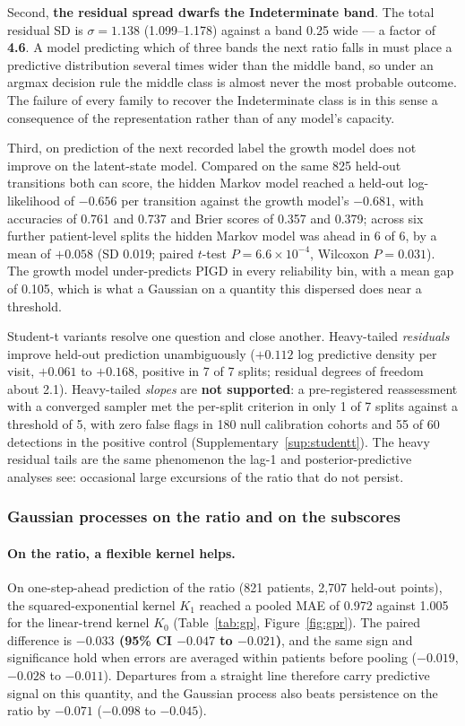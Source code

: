 \documentclass[11pt]{article}
\begin{document}
Second, \textbf{the residual spread dwarfs the Indeterminate band}. The total
residual SD is $\sigma = 1.138$ (1.099--1.178) against a band 0.25 wide --- a
factor of \textbf{4.6}. A model predicting which of three bands the next ratio
falls in must place a predictive distribution several times wider than the middle
band, so under an argmax decision rule the middle class is almost never the most
probable outcome. The failure of every family to recover the Indeterminate class
is in this sense a consequence of the representation rather than of any model's
capacity.

Third, on prediction of the next recorded label the growth model does not improve
on the latent-state model. Compared on the same 825 held-out transitions both can
score, the hidden Markov model reached a held-out log-likelihood of $-0.656$ per
transition against the growth model's $-0.681$, with accuracies of 0.761 and
0.737 and Brier scores of 0.357 and 0.379; across six further patient-level
splits the hidden Markov model was ahead in 6 of 6, by a mean of $+0.058$ (SD
0.019; paired $t$-test $P = 6.6\times10^{-4}$, Wilcoxon $P = 0.031$). The growth
model under-predicts PIGD in every reliability bin, with a mean gap of 0.105,
which is what a Gaussian on a quantity this dispersed does near a threshold.

Student-t variants resolve one question and close another. Heavy-tailed
\emph{residuals} improve held-out prediction unambiguously ($+0.112$ log
predictive density per visit, $+0.061$ to $+0.168$, positive in 7 of 7 splits;
residual degrees of freedom about 2.1). Heavy-tailed \emph{slopes} are
\textbf{not supported}: a pre-registered reassessment with a converged sampler met
the per-split criterion in only 1 of 7 splits against a threshold of 5, with zero
false flags in 180 null calibration cohorts and 55 of 60 detections in the
positive control (Supplementary~\ref{sup:studentt}). The heavy residual tails are
the same phenomenon the lag-1 and posterior-predictive analyses see: occasional
large excursions of the ratio that do not persist.

\subsubsection{Gaussian processes on the ratio and on the subscores}

\paragraph{On the ratio, a flexible kernel helps.}
On one-step-ahead prediction of the ratio (821 patients, 2,707 held-out points),
the squared-exponential kernel $K_1$ reached a pooled MAE of 0.972 against 1.005
for the linear-trend kernel $K_0$ (Table~\ref{tab:gp}, Figure~\ref{fig:gpr}). The
paired difference is \textbf{$-0.033$ (95\% CI $-0.047$ to $-0.021$)}, and the
same sign and significance hold when errors are averaged within patients before
pooling ($-0.019$, $-0.028$ to $-0.011$). Departures from a straight line
therefore carry predictive signal on this quantity, and the Gaussian process also
beats persistence on the ratio by $-0.071$ ($-0.098$ to $-0.045$).
\end{document}
